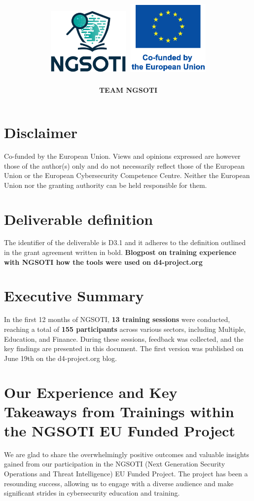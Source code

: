 \documentclass[10pt,a4paper]{report}
\title{
    \Huge \textbf{\delivtitle} \\[0.5cm]
    \includegraphics[width=0.3\textwidth]{img/ngsoti.eps}
    \hspace{1cm}
    \includegraphics[width=0.3\textwidth]{img/eu_funded_en.eps}
}
\author{\textbf{TEAM NGSOTI}}
\date{\delivdate}
\begin{document}
\maketitle
\thispagestyle{empty} %

\newpage
\tableofcontents
\newpage
\section*{Disclaimer}
Co-funded by the European Union. Views and opinions expressed are however
those of the author(s) only and do not necessarily reflect those of the
European Union or the European Cybersecurity Competence Centre. Neither
the European Union nor the granting authority can be held responsible for them.

\section*{Deliverable definition}
The identifier of the deliverable is D3.1 and it adheres to the definition
outlined in the grant agreement written in bold.
\textbf{Blogpost on training experience with NGSOTI how the tools were used on d4-project.org}

\section*{Executive Summary}
In the first 12 months of NGSOTI, \textbf{13 training sessions} were conducted, reaching
a total of \textbf{155 participants} across various sectors, including Multiple,
Education, and Finance. During these sessions, feedback was collected, and
the key findings are presented in this document. The first version was published on June 19th on the d4-project.org blog.

\section*{Our Experience and Key Takeaways from Trainings within the NGSOTI EU Funded Project}

We are glad to share the overwhelmingly positive outcomes and valuable
insights gained from our participation in the NGSOTI (Next Generation Security
Operations and Threat Intelligence) EU Funded Project. The project has been a
resounding success, allowing us to engage with a diverse audience and make
significant strides in cybersecurity education and training.
\end{document}

